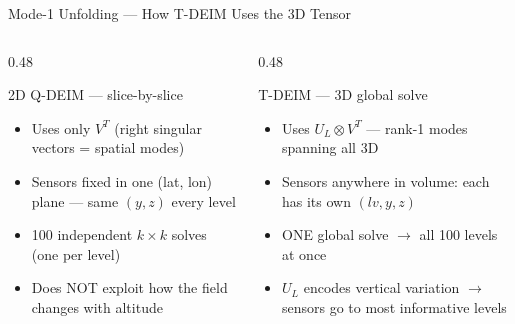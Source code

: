 \documentclass[aspectratio=169, 11pt]{beamer}
\begin{document}
\begin{frame}{Mode-1 Unfolding — How T-DEIM Uses the 3D Tensor}
\begin{columns}[T]
\begin{column}{0.48\textwidth}
  \begingroup
  \begin{block}{2D Q-DEIM — slice-by-slice}
    \scriptsize
    \begin{itemize}\setlength\itemsep{0.15em}
      \item Uses only $V^T$ (right singular vectors = spatial modes)
      \item Sensors fixed in one (lat, lon) plane — same $(y,z)$ every level
      \item 100 independent $k\!\times\!k$ solves (one per level)
      \item Does NOT exploit how the field changes with altitude
    \end{itemize}
  \end{block}
  \endgroup
\end{column}
\begin{column}{0.48\textwidth}
  \begingroup
  \begin{block}{T-DEIM — 3D global solve}
    \scriptsize
    \begin{itemize}\setlength\itemsep{0.15em}
      \item Uses $U_L \otimes V^T$ — rank-1 modes spanning all 3D
      \item Sensors anywhere in volume: each has its own $(lv, y, z)$
      \item ONE global solve $\to$ all 100 levels at once
      \item $U_L$ encodes vertical variation $\to$ sensors go to most informative levels
    \end{itemize}
  \end{block}
  \endgroup
\end{column}
\end{columns}

\end{frame}
\end{document}
